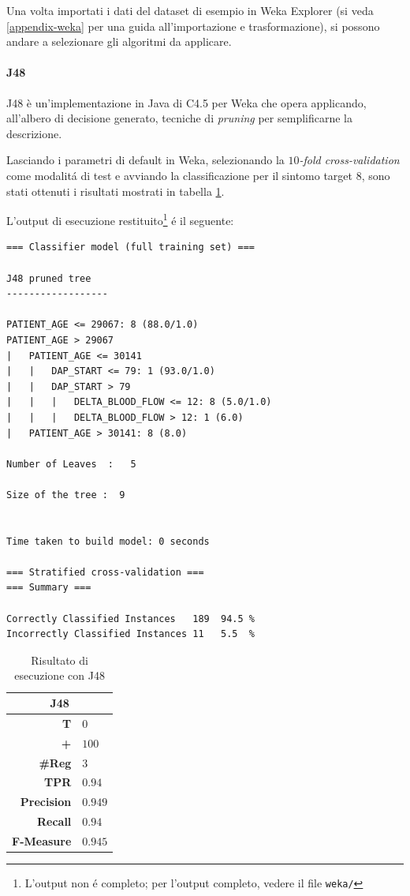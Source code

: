 \documentclass[preprint]{acm_proc_article-sp}
\begin{document}
Una volta importati i dati del dataset di esempio in Weka Explorer (si veda \ref{appendix-weka} per una guida all'importazione e trasformazione), si possono andare a selezionare gli algoritmi da applicare.

\paragraph{J48}
J48 è un'implementazione in Java di C4.5 per Weka che opera applicando, all'albero di decisione generato, tecniche di \textit{pruning} per semplificarne la descrizione.

Lasciando i parametri di default in Weka, selezionando la $10$\textit{-fold cross-validation} come modalit\'a di test e avviando la classificazione per il sintomo target $8$, sono stati ottenuti i risultati mostrati in tabella \ref{table:risultati-j48}.

L'output di esecuzione restituito\footnote{L'output non \'e completo; per l'output completo, vedere il file \verb|weka/|} \'e il seguente:

\begin{verbatim}
=== Classifier model (full training set) ===

J48 pruned tree
------------------

PATIENT_AGE <= 29067: 8 (88.0/1.0)
PATIENT_AGE > 29067
|   PATIENT_AGE <= 30141
|   |   DAP_START <= 79: 1 (93.0/1.0)
|   |   DAP_START > 79
|   |   |   DELTA_BLOOD_FLOW <= 12: 8 (5.0/1.0)
|   |   |   DELTA_BLOOD_FLOW > 12: 1 (6.0)
|   PATIENT_AGE > 30141: 8 (8.0)

Number of Leaves  :   5

Size of the tree :  9


Time taken to build model: 0 seconds

=== Stratified cross-validation ===
=== Summary ===

Correctly Classified Instances   189  94.5 %
Incorrectly Classified Instances 11   5.5  %
\end{verbatim}

\begin{table}[h]
\centering
\begin{tabular}{|r|l|} \hline
\multicolumn{2}{|c|}{\textbf{J48}} \\ \hline \hline 
\textbf{T} & $0$ \\ \hline
\textbf{+} & $100$ \\ \hline
\textbf{\#Reg} & $3$\\ \hline
\textbf{TPR} & $0.94$ \\ \hline
\textbf{Precision} & $0.949$ \\ \hline
\textbf{Recall} & $0.94$ \\  \hline
\textbf{F-Measure} & $0.945$ \\
\hline\end{tabular}
\caption{Risultato di esecuzione con J48}
\label{table:risultati-j48}
\end{table}
\end{document}
